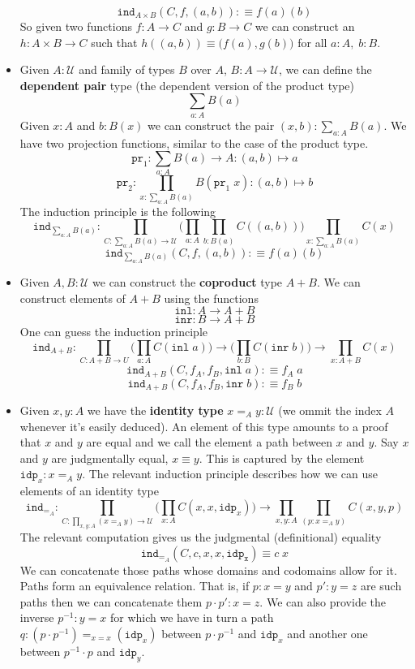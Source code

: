 \documentclass[12pt]{report}
\begin{document}
\begin{itemize}
	$$\mathtt{ind}_{A\times B}(C, f, (a,b)) : \equiv f(a)(b)$$
	So given two functions $f: A\rightarrow C$ and $g : B \rightarrow C$ we can construct an $h : A\times B \rightarrow C$ such that $h((a,b)) \equiv \big(f(a), g(b)\big)$ for all $a:A,\; b:B$.
	\item Given $A : \mathcal{U}$ and family of types $B$ over $A$, $B : A \rightarrow \mathcal{U}$, we can define the \textbf{dependent pair} type (the dependent version of the product type)
	$$\sum_{a : A} B(a)$$
	Given $x : A$ and $b : B(x)$ we can construct the pair $(x,b) : \sum_{a : A} B(a)$. 
	We have two projection functions, similar to the case of the product type.
	$$\mathtt{pr}_1 : \sum_{a:A}B(a) \rightarrow A : (a,b) \mapsto a$$
	$$\mathtt{pr}_2 : \prod_{x : \sum_{a:A}B(a)}B(\mathtt{pr}_1\; x) : (a,b) \mapsto b$$
	The induction principle is the following
	$$\mathtt{ind}_{\sum_{a:A}B(a)} : \prod_{C : \sum_{a:A}B(a) \rightarrow \mathcal{U}}\Big( \prod_{a : A}\prod_{b : B(a)}C((a,b)) \Big)\prod_{x : \sum_{a:A}B(a)}C(x)$$
	$$\mathtt{ind}_{\sum_{a:A}B(a)}(C, f,(a,b) ) :\equiv f(a)(b)$$
	\item Given $A, B : \mathcal{U}$ we can construct the \textbf{coproduct} type $A + B$. 
	We can construct elements of $A + B$ using the functions
	$$\mathtt{inl} : A \rightarrow A+B$$
	$$\mathtt{inr} : B \rightarrow A+B$$
	One can guess the induction principle
	$$\mathtt{ind}_{A+B} : \prod_{C : A+B \rightarrow U} \Big(\prod_{a : A}C(\mathtt{inl}\;a)\Big) \rightarrow \Big(\prod_{b : B}C(\mathtt{inr}\;b)\Big) \rightarrow \prod_{x : A+ B}C(x)$$
	$$\mathtt{ind}_{A+B}(C, f_A, f_B, \mathtt{inl}\; a) :\equiv f_A\; a$$
	$$\mathtt{ind}_{A+B}(C, f_A, f_B, \mathtt{inr}\; b) :\equiv f_B\; b$$
	\item Given $x, y : A$ we have the \textbf{identity type} $x =_A y : \mathcal{U}$ (we ommit the index $A$ whenever it's easily deduced). 
	An element of this type amounts to a proof that $x$ and $y$ are equal and we call the element a path between $x$ and $y$. 
	Say $x$ and $y$ are judgmentally equal, $x \equiv y$. 
	This is captured by the element $\mathtt{idp}_x : x =_A y$. 
	The relevant induction principle describes how we can use elements of an identity type
	$$\mathtt{ind}_{=_{A}} : \prod_{C : \prod_{x,y : A} (x =_A y) \rightarrow \mathcal{U}} \Big( \prod_{x : A}C(x,x,\mathtt{idp}_x) \Big) \rightarrow \prod_{x,y : A} \prod_{(p : x =_A y)} C(x,y,p)$$
	The relevant computation gives us the judgmental (definitional) equality 
	$$\mathtt{ind}_{=_A} (C,c,x,x,\mathtt{idp_x}) \equiv c\; x$$
	We can concatenate those paths whose domains and codomains allow for it. 
	Paths form an equivalence relation. That is, if $p : x = y$ and $p' : y = z$ are such paths then we can concatenate them $p \cdot p' : x = z$. 
	We can also provide the inverse $p^{-1} : y = x$ for which we have in turn a path $q : (p\cdot p^{-1}) =_{x=x} (\mathtt{idp}_x)$ between $p\cdot p^{-1}$ and $\mathtt{idp}_x$ and another one between $p^{-1}\cdot p$ and $\mathtt{idp}_y$. 
\end{itemize}
\end{document}
